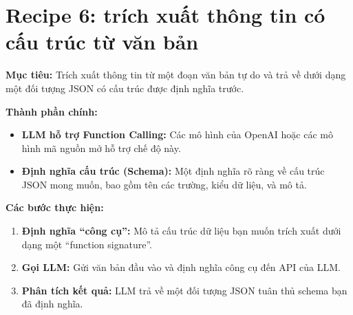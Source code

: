 
\section{Recipe 6: trích xuất thông tin có cấu trúc từ văn bản}
\label{sec:recipe_structured_extraction}

\textbf{Mục tiêu:} Trích xuất thông tin từ một đoạn văn bản tự do và trả về dưới dạng một đối tượng JSON có cấu trúc được định nghĩa trước.

\textbf{Thành phần chính:}
\begin{itemize}
    \item \textbf{LLM hỗ trợ Function Calling:} Các mô hình của OpenAI hoặc các mô hình mã nguồn mở hỗ trợ chế độ này.
    \item \textbf{Định nghĩa cấu trúc (Schema):} Một định nghĩa rõ ràng về cấu trúc JSON mong muốn, bao gồm tên các trường, kiểu dữ liệu, và mô tả.
\end{itemize}

\textbf{Các bước thực hiện:}
\begin{enumerate}
    \item \textbf{Định nghĩa “công cụ”:} Mô tả cấu trúc dữ liệu bạn muốn trích xuất dưới dạng một “function signature”.
    \item \textbf{Gọi LLM:} Gửi văn bản đầu vào và định nghĩa công cụ đến API của LLM.
    \item \textbf{Phân tích kết quả:} LLM trả về một đối tượng JSON tuân thủ schema bạn đã định nghĩa.
\end{enumerate}

